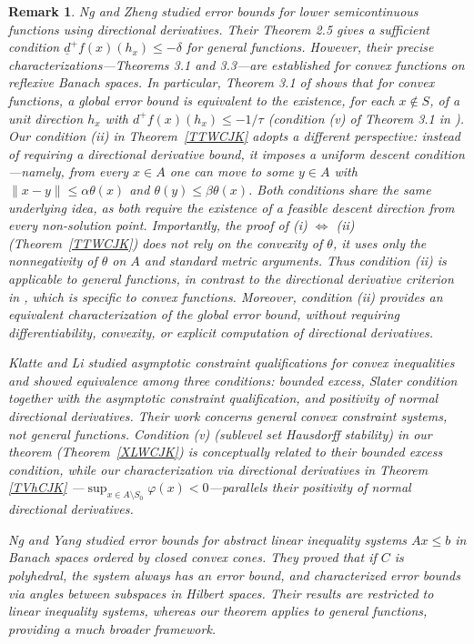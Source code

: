 \documentclass[11pt]{article}
\newtheorem{remark}{Remark}[section]
\begin{document}
\begin{remark}
	
	Ng and Zheng \cite{NgZheng} studied error bounds for lower semicontinuous functions using directional derivatives. Their Theorem 2.5 gives a sufficient condition \(\underline{d}^+f(x)(h_x)\le -\delta\) for general functions. However, their precise characterizations—Theorems 3.1 and 3.3—are established for convex functions on reflexive Banach spaces. In particular, Theorem 3.1 of \cite{NgZheng} shows that for convex functions, a global error bound is equivalent to the existence, for each \(x\notin S\), of a unit direction \(h_x\) with \(d^+f(x)(h_x)\le -1/\tau\) (condition (v) of Theorem 3.1 in \cite{NgZheng}). Our condition (ii) in Theorem~\ref{TTWCJK} adopts a different perspective: instead of requiring a directional derivative bound, it imposes a uniform descent condition—namely, from every \(x\in A\) one can move to some \(y\in A\) with \(\|x-y\|\le \alpha\theta(x)\) and \(\theta(y)\le \beta\theta(x)\).    Both conditions share the same underlying idea, as both require the existence of a feasible descent direction from every non-solution point.         Importantly, the proof of  (i) $\Leftrightarrow$ (ii) (Theorem~\ref{TTWCJK}) does not rely on the convexity   of \(\theta\),  it uses only the nonnegativity of \(\theta\) on \(A\) and standard metric arguments. Thus condition (ii) is applicable to general functions, in contrast to the directional derivative criterion in \cite{NgZheng}, which is specific to convex functions.  Moreover,  condition (ii) provides an equivalent characterization of the global error bound, without requiring differentiability, convexity, or explicit computation of directional derivatives.
	
	
	
	
	
	Klatte and Li  	\cite{KL1999}  studied asymptotic constraint qualifications for convex inequalities and showed equivalence among three conditions: bounded excess, Slater condition together with the asymptotic constraint qualification, and positivity of normal directional derivatives. Their work concerns general convex constraint systems, not general functions. Condition (v) (sublevel set Hausdorff stability) in our theorem (Theorem~\ref{XLWCJK}) is conceptually related to their bounded excess condition, while our characterization via directional derivatives in Theorem  \ref{TVhCJK} ---\(\sup_{x\in A\setminus S_0}\varphi(x)<0\)---parallels their positivity of normal directional derivatives.
	
	Ng and Yang   	\cite{NgYang2002}   studied error bounds for abstract linear inequality systems \(Ax\le b\) in Banach spaces ordered by closed convex cones. They proved that if \(C\) is polyhedral, the system always has an error bound, and characterized error bounds via angles between subspaces in Hilbert spaces. Their results are restricted to linear inequality systems, whereas our theorem applies to general functions, providing a much broader framework.
	

\end{remark}
\end{document}
